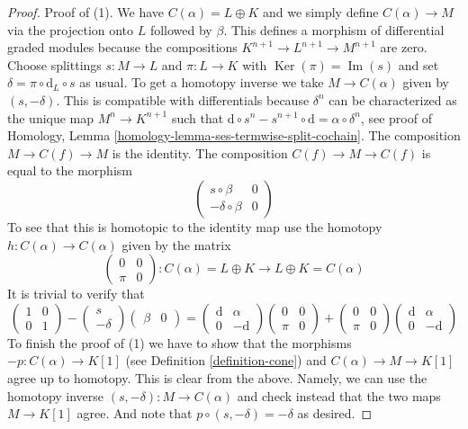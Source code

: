 \documentclass[10pt,a4paper]{amsart}
\theoremstyle{plain}
\theoremstyle{definition}
\theoremstyle{remark}
\numberwithin{equation}{subsection}
\def\Ker{\mathop{\mathrm{Ker}}}
\def\Im{\mathop{\mathrm{Im}}}
\begin{document}
\begin{proof}
Proof of (1). We have $C(\alpha) = L \oplus K$ and we simply define
$C(\alpha) \to M$ via the projection onto $L$ followed by $\beta$.
This defines a morphism of differential graded modules because the
compositions $K^{n + 1} \to L^{n + 1} \to M^{n + 1}$ are zero.
Choose splittings $s : M \to L$ and $\pi : L \to K$ with
$\Ker(\pi) = \Im(s)$ and set
$\delta = \pi \circ \text{d}_L \circ s$ as usual.
To get a homotopy inverse we take
$M \to C(\alpha)$ given by $(s , -\delta)$. This is compatible with
differentials because $\delta^n$ can be characterized as the
unique map $M^n \to K^{n + 1}$ such that
$\text{d} \circ s^n - s^{n + 1} \circ \text{d} = \alpha \circ \delta^n$,
see proof of
Homology, Lemma \ref{homology-lemma-ses-termwise-split-cochain}.
The composition $M \to C(f) \to M$ is the identity.
The composition $C(f) \to M \to C(f)$ is equal to the morphism
$$
\left(
\begin{matrix}
s \circ \beta & 0 \\
-\delta \circ \beta & 0
\end{matrix}
\right)
$$
To see that this is homotopic to the identity map
use the homotopy $h : C(\alpha) \to C(\alpha)$
given by the matrix
$$
\left(
\begin{matrix}
0 & 0 \\
\pi & 0
\end{matrix}
\right) :
C(\alpha) = L \oplus K
\to
L \oplus K = C(\alpha)
$$
It is trivial to verify that
$$
\left(
\begin{matrix}
1 & 0 \\
0 & 1
\end{matrix}
\right)
-
\left(
\begin{matrix}
s \\
-\delta
\end{matrix}
\right)
\left(
\begin{matrix}
\beta & 0
\end{matrix}
\right)
=
\left(
\begin{matrix}
\text{d} & \alpha \\
0 & -\text{d}
\end{matrix}
\right)
\left(
\begin{matrix}
0 & 0 \\
\pi & 0
\end{matrix}
\right)
+
\left(
\begin{matrix}
0 & 0 \\
\pi & 0
\end{matrix}
\right)
\left(
\begin{matrix}
\text{d} & \alpha \\
0 & -\text{d}
\end{matrix}
\right)
$$
To finish the proof of (1) we have to show that the morphisms
$-p : C(\alpha) \to K[1]$ (see
Definition \ref{definition-cone})
and $C(\alpha) \to M \to K[1]$ agree up
to homotopy. This is clear from the above. Namely, we can use the homotopy
inverse $(s, -\delta) : M \to C(\alpha)$
and check instead that the two maps
$M \to K[1]$ agree. And note that
$p \circ (s, -\delta) = -\delta$ as desired.


\end{proof}
\end{document}
